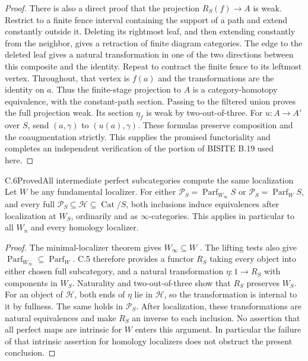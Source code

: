 \begin{proof}
There is also a direct proof that the projection $R_S(f)\to A$
is weak. Restrict to a finite fence interval containing the
support of a path and extend constantly outside it. Deleting
its rightmost leaf, and then extending constantly from the
neighbor, gives a retraction of finite diagram categories.
The edge to the deleted leaf gives a natural transformation
in one of the two directions between this composite and the
identity. Repeat to contract the finite fence to its leftmost
vertex. Throughout, that vertex is $f(a)$ and the transformations
are the identity on $a$. Thus the finite-stage projection to
$A$ is a category-homotopy equivalence, with the constant-path
section. Passing to the filtered union proves the full
projection weak. Its section $\eta_f$ is weak by two-out-of-three.
For $u:A\to A'$ over $S$, send $(a,\gamma)$ to $(u(a),\gamma)$.
These formulas preserve composition and the coaugmentation
strictly. This supplies the promised functoriality and completes
an independent verification of the portion of BISITE B.19 used here.
\end{proof}

\begin{claim}{C.6}{Proved}{All intermediate perfect subcategories compute the same localization}
Let $W$ be any fundamental localizer. For either
$\mathcal P_S=\operatorname{Parf}_{W_\infty}S$ or
$\mathcal P_S=\operatorname{Parf}_W S$, and every full
$\mathcal P_S\subseteq\mathcal H\subseteq\operatorname{Cat}/S$,
both inclusions induce equivalences after localization at $W_S$,
ordinarily and as $\infty$-categories. This applies in particular
to all $W_n$ and every homology localizer.
\end{claim}
\begin{proof}
The minimal-localizer theorem gives $W_\infty\subseteq W$
\citep[Theorem~6.1.18]{RESCisinski2006}. The lifting tests also
give $\operatorname{Parf}_{W_\infty}\subseteq\operatorname{Parf}_W$.
C.5 therefore provides a functor $R_S$ taking every object into
either chosen full subcategory, and a natural transformation
$\eta:1\to R_S$ with components in $W_S$. Naturality and
two-out-of-three show that $R_S$ preserves $W_S$.
For an object of $\mathcal H$, both ends of $\eta$ lie in
$\mathcal H$, so the transformation is internal to it by
fullness. The same holds in $\mathcal P_S$.
After localization, these transformations are natural
equivalences and make $R_S$ an inverse to each inclusion.
No assertion that all perfect maps are intrinsic for $W$
enters this argument. In particular the failure of that
intrinsic assertion for homology localizers does not obstruct
the present conclusion.
\end{proof}


